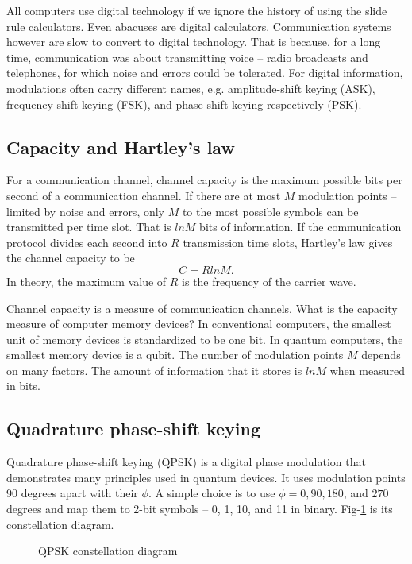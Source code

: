 \documentclass[oneside, letter, 12pt]{book}
\begin{document}
All computers use digital technology if we ignore the history of using the slide rule calculators. Even abacuses are digital calculators. Communication systems however are slow to convert to digital technology. That is because, for a long time, communication was about transmitting voice -- radio broadcasts and telephones, for which noise and errors could be tolerated. For digital information, modulations often carry different names, e.g. amplitude-shift keying (ASK), frequency-shift keying (FSK), and phase-shift keying respectively (PSK).

\subsection{Capacity and Hartley's law}
For a communication channel, channel capacity is the maximum possible bits per second of a communication channel. If there are at most $M$ modulation points -- limited by noise and errors, only $M$ to the most possible symbols can be transmitted per time slot. That is $ln M$ bits of information. If the communication protocol divides each second into $R$ transmission time slots, Hartley's law gives the channel capacity to be
\begin{equation}
    C = R ln M.
\end{equation}
In theory, the maximum value of $R$ is the frequency of the carrier wave.

Channel capacity is a measure of communication channels. What is the capacity measure of computer memory devices? In conventional computers, the smallest unit of memory devices is standardized to be one bit. In quantum computers, the smallest memory device is a qubit. The number of modulation points $M$ depends on many factors. The amount of information that it stores is $ln M$ when measured in bits.

\subsection{Quadrature phase-shift keying}
Quadrature phase-shift keying (QPSK) is a digital phase modulation that demonstrates many principles used in quantum devices. It uses modulation points 90 degrees apart with their $\phi$. A simple choice is to use $\phi = 0, 90, 180$, and $270$ degrees and map them to 2-bit symbols -- 0, 1, 10, and 11 in binary. Fig-\ref{QPSK} is its constellation diagram.

\begin{figure}[h]\label{QPSK}
\caption{QPSK constellation diagram}
\end{figure}
\end{document}
